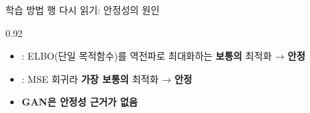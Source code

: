 \begin{frame}{학습 방법 행 다시 읽기: 안정성의 원인}
\begin{center}\begin{varwidth}{0.92\textwidth}
  \begin{itemize}
    \item {}: ELBO(단일 목적함수)를 역전파로 최대화하는
      \textbf{보통의} 최적화 → \textbf{안정}
    \item {}: MSE 회귀라 \textbf{가장 보통의} 최적화 →
      \textbf{안정}
    
    \item \textbf{GAN은 안정성 근거가 없음}
  \end{itemize}
\end{varwidth}\end{center}
\end{frame}
